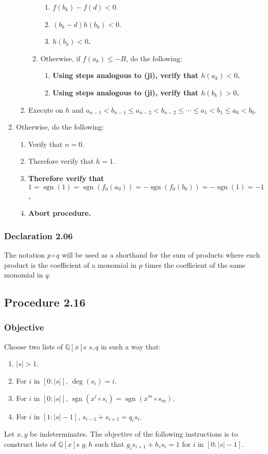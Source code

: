 \documentclass[twocolumn]{article}
\DeclareMathOperator{\sgn}{sgn}
\newcommand{\declaration}[1]{\subsubsection*{Declaration #1}\label{sec:declaration #1}}
\newcommand{\procedure}[2][]{\subsection*{Procedure #2 \ifthenelse{\equal{#1}{}}{}{(#1)}}\label{sec:procedure #2}}
\newcommand{\objective}{\subsubsection*{Objective}}
\newcommand{\procedurehr}[2][]{\hyperref[sec:procedure #2]{\ifthenelse{\equal{#1}{}}{procedure #2}{#1}}}
\begin{document}
\begin{enumerate}
\begin{enumerate}
\begin{enumerate}
\begin{enumerate}
								\item $f(b_k)-f(d)<0$.
								\item $(b_k-d)h(b_k)<0$.
								\item \textbf{$h(b_k)<0$.}
							\end{enumerate}
							\item Otherwise, if $f(a_k)\le -B$, do the following:
							\begin{enumerate}
								\item \textbf{Using steps analogous to (ji), verify that $h(a_k)<0$.}
								\item \textbf{Using steps analogous to (ji), verify that $h(b_k)>0$.}
							\end{enumerate}
						\end{enumerate}
						\item Execute \procedurehr{2.15} on $h$ and $a_{n-1}<b_{n-1}\le a_{n-2}<b_{n-2}\le\cdots\le a_1<b_1\le a_0<b_0$.
					\end{enumerate}
					\item Otherwise, do the following:
					\begin{enumerate}
						\item Verify that $n=0$.
						\item Therefore verify that $h=1$.
						\item \textbf{Therefore verify that $1=\sgn(1)=\sgn(f_0(a_0))=-\sgn(f_0(b_0))=-\sgn(1)=-1$.}
						\item \textbf{Abort procedure.}
					\end{enumerate}
				\end{enumerate}
		\declaration{2.06}
			The notation $p\circ q$ will be used as a shorthand for the sum of products where each product is the coefficient of a monomial in $p$ times the coefficient of the same monomial in $q$.
		\procedure{2.16}
			\objective
				Choose two lists of $\mathbb{Q}[x]$s $s,q$ in such a way that:
				\begin{enumerate}
					\item $\lvert s\rvert>1$.
					\item For $i$ in $[0:\lvert s\rvert]$, $\deg(s_i)=i$.
					\item For $i$ in $[0:\lvert s\rvert]$, $\sgn(x^i\circ s_i)=\sgn(x^m\circ s_m)$.
					\item For $i$ in $[1:\lvert s\rvert-1]$, $s_{i-1}+s_{i+1}=q_is_i$.
				\end{enumerate}
				Let $x,y$ be indeterminates. The objective of the following instructions is to construct lists of $\mathbb{Q}[x]$s $g,h$ such that $g_is_{i+1}+h_is_i=1$ for $i$ in $[0:\lvert s\rvert-1]$.
\end{document}
